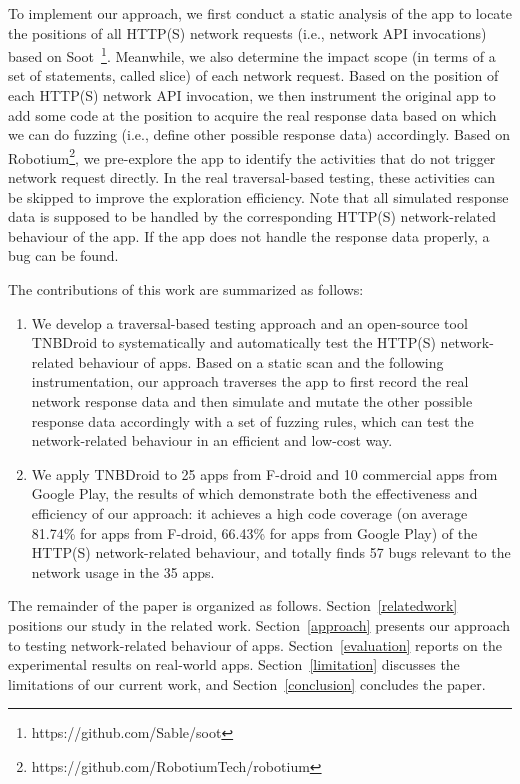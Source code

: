 \documentclass[sigconf,review, anonymous]{acmart}
\begin{document}
To implement our approach, we first conduct a static analysis of the app to locate the positions of all HTTP(S) network requests (i.e., network API invocations) based on \textsf{Soot}~\cite{sootpaper}\footnote{https://github.com/Sable/soot}. Meanwhile, we also determine the impact scope (in terms of a set of statements, called slice) of each network request. Based on the position of each HTTP(S) network API invocation, we then instrument the original app to add some code at the position to acquire the real response data based on which we can do fuzzing (i.e., define other possible response data) accordingly. Based on \textsf{Robotium}\footnote{https://github.com/RobotiumTech/robotium},  we pre-explore the app to identify the activities that do not trigger network request directly. In the real traversal-based testing, these activities can be skipped to improve the exploration efficiency. Note that all simulated response data is supposed to be handled by the corresponding HTTP(S) network-related behaviour of the app. If the app does not handle the response data properly, a bug can be found.      

The contributions of this work are summarized as follows:
\begin{enumerate}
\item We develop a traversal-based testing approach and an open-source tool \textsf{TNBDroid} to systematically and automatically test the HTTP(S) network-related behaviour of apps. Based on a static scan and the following instrumentation, our approach traverses the app to first record the real network response data and then simulate and mutate the other possible response data accordingly with a set of fuzzing rules, which can test the network-related behaviour in an efficient and low-cost way.
\item We apply \textsf{TNBDroid} to 25 apps from F-droid and 10 commercial apps from Google Play, the results of which demonstrate both the effectiveness and efficiency of our approach: it achieves a high code coverage (on average 81.74\% for apps from F-droid, 66.43\% for apps from Google Play) of the HTTP(S) network-related behaviour, and totally finds 57 bugs relevant to the network usage in the 35 apps.
\end{enumerate}    


The remainder of the paper is organized as follows. Section~\ref{relatedwork} positions our study in the related work.
Section~\ref{approach} presents our approach to testing network-related behaviour of apps.
Section~\ref{evaluation} reports on the experimental results on real-world apps. Section~\ref{limitation} discusses the limitations of our current work, and Section~\ref{conclusion} concludes the paper.
\end{document}

